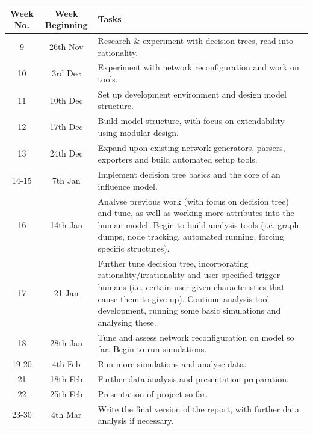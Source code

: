 \documentclass[]{article}
\begin{document}
\begin{landscape}
\begin{table}
	\centering
		\begin{tabular}{|c|c|p{12cm}|}
		\hline
			Week No. & Week Beginning & Tasks \\
			\hline
			9 & 26th Nov & Research \& experiment with decision trees, read into rationality. \\
			\hline
			10 & 3rd Dec & Experiment with network reconfiguration and work on tools. \\
			\hline
			11 & 10th Dec & Set up development environment and design model structure. \\
			\hline
			12 & 17th Dec & Build model structure, with focus on extendability using modular design. \\
			\hline
			13 & 24th Dec & Expand upon existing network generators, parsers, exporters and build automated setup tools. \\
			\hline
			14-15 & 7th Jan & Implement decision tree basics and the core of an influence model. \\
			\hline
			16 & 14th Jan & Analyse previous work (with focus on decision tree) and tune, as well as working more attributes into the human model. Begin to build analysis tools (i.e. graph dumps, node tracking, automated running, forcing specific structures).\\
			\hline
			17 & 21 Jan & Further tune decision tree, incorporating rationality/irrationality and user-specified trigger humans (i.e. certain user-given characteristics that cause them to give up). Continue analysis tool development, running some basic simulations and analysing these. \\
			\hline
			18 & 28th Jan & Tune and assess network reconfiguration on model so far. Begin to run simulations.\\
			\hline
			19-20 & 4th Feb & Run more simulations and analyse data.\\
			\hline
			21 & 18th Feb & Further data analysis and presentation preparation.\\
			\hline
			22 & 25th Feb & Presentation of project so far.\\
			\hline
			23-30 & 4th Mar & Write the final version of the report, with further data analysis if necessary.\\
			\hline
		\end{tabular}
		\label{timetable}
\end{table}
\end{landscape}




\end{document}
